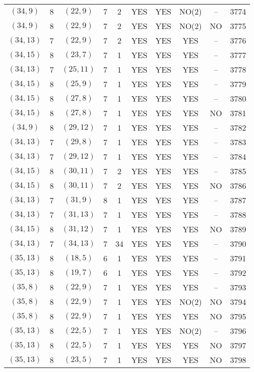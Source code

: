 \begin{longtable}{|c|c|c|c|c|c|c|c|c|c|}
$(34, 9)$ & 8 & $(22, 9)$ & 7 & 2 & YES & YES & NO(2) & -- & 3774\\
$(34, 9)$ & 8 & $(22, 9)$ & 7 & 2 & YES & YES & NO(2) & NO & 3775\\
$(34, 13)$ & 7 & $(22, 9)$ & 7 & 2 & YES & YES & YES & -- & 3776\\
$(34, 15)$ & 8 & $(23, 7)$ & 7 & 1 & YES & YES & YES & -- & 3777\\
$(34, 13)$ & 7 & $(25, 11)$ & 7 & 1 & YES & YES & YES & -- & 3778\\
$(34, 15)$ & 8 & $(25, 9)$ & 7 & 1 & YES & YES & YES & -- & 3779\\
$(34, 15)$ & 8 & $(27, 8)$ & 7 & 1 & YES & YES & YES & -- & 3780\\
$(34, 15)$ & 8 & $(27, 8)$ & 7 & 1 & YES & YES & YES & NO & 3781\\
$(34, 9)$ & 8 & $(29, 12)$ & 7 & 1 & YES & YES & YES & -- & 3782\\
$(34, 13)$ & 7 & $(29, 8)$ & 7 & 1 & YES & YES & YES & -- & 3783\\
$(34, 13)$ & 7 & $(29, 12)$ & 7 & 1 & YES & YES & YES & -- & 3784\\
$(34, 15)$ & 8 & $(30, 11)$ & 7 & 2 & YES & YES & YES & -- & 3785\\
$(34, 15)$ & 8 & $(30, 11)$ & 7 & 2 & YES & YES & YES & NO & 3786\\
$(34, 13)$ & 7 & $(31, 9)$ & 8 & 1 & YES & YES & YES & -- & 3787\\
$(34, 13)$ & 7 & $(31, 13)$ & 7 & 1 & YES & YES & YES & -- & 3788\\
$(34, 15)$ & 8 & $(31, 12)$ & 7 & 1 & YES & YES & YES & NO & 3789\\
$(34, 13)$ & 7 & $(34, 13)$ & 7 & 34 & YES & YES & YES & -- & 3790\\
$(35, 13)$ & 8 & $(18, 5)$ & 6 & 1 & YES & YES & YES & -- & 3791\\
$(35, 13)$ & 8 & $(19, 7)$ & 6 & 1 & YES & YES & YES & -- & 3792\\
$(35, 8)$ & 8 & $(22, 9)$ & 7 & 1 & YES & YES & YES & -- & 3793\\
$(35, 8)$ & 8 & $(22, 9)$ & 7 & 1 & YES & YES & NO(2) & NO & 3794\\
$(35, 8)$ & 8 & $(22, 9)$ & 7 & 1 & YES & YES & YES & NO & 3795\\
$(35, 13)$ & 8 & $(22, 5)$ & 7 & 1 & YES & YES & NO(2) & -- & 3796\\
$(35, 13)$ & 8 & $(22, 5)$ & 7 & 1 & YES & YES & YES & NO & 3797\\
$(35, 13)$ & 8 & $(23, 5)$ & 7 & 1 & YES & YES & YES & NO & 3798\\

\end{longtable}
